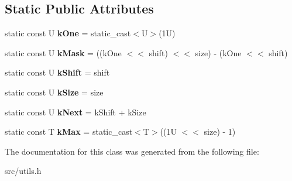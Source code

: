 \subsection*{Static Public Attributes}
\begin{DoxyCompactItemize}
\item 
\hypertarget{classv8_1_1internal_1_1_bit_field_base_af2b0229ffee57c76f39b6a3aad6d22bb}{}static const U {\bfseries k\+One} = static\+\_\+cast$<$U$>$(1\+U)\label{classv8_1_1internal_1_1_bit_field_base_af2b0229ffee57c76f39b6a3aad6d22bb}

\item 
\hypertarget{classv8_1_1internal_1_1_bit_field_base_a26880a1aa7d61fe08bcf77de9ca46b6f}{}static const U {\bfseries k\+Mask} = ((k\+One $<$$<$ shift) $<$$<$ size) -\/ (k\+One $<$$<$ shift)\label{classv8_1_1internal_1_1_bit_field_base_a26880a1aa7d61fe08bcf77de9ca46b6f}

\item 
\hypertarget{classv8_1_1internal_1_1_bit_field_base_a0b0c87744aa976ba62aadb4552e633ef}{}static const U {\bfseries k\+Shift} = shift\label{classv8_1_1internal_1_1_bit_field_base_a0b0c87744aa976ba62aadb4552e633ef}

\item 
\hypertarget{classv8_1_1internal_1_1_bit_field_base_a73ac861af5e2f043ea3ef16bc102571b}{}static const U {\bfseries k\+Size} = size\label{classv8_1_1internal_1_1_bit_field_base_a73ac861af5e2f043ea3ef16bc102571b}

\item 
\hypertarget{classv8_1_1internal_1_1_bit_field_base_ac924450272ea6ed882a43eba783d3488}{}static const U {\bfseries k\+Next} = k\+Shift + k\+Size\label{classv8_1_1internal_1_1_bit_field_base_ac924450272ea6ed882a43eba783d3488}

\item 
\hypertarget{classv8_1_1internal_1_1_bit_field_base_a82aada63ffb94bf07ba4702ec9fc1525}{}static const T {\bfseries k\+Max} = static\+\_\+cast$<$T$>$((1\+U $<$$<$ size) -\/ 1)\label{classv8_1_1internal_1_1_bit_field_base_a82aada63ffb94bf07ba4702ec9fc1525}

\end{DoxyCompactItemize}


The documentation for this class was generated from the following file\+:\begin{DoxyCompactItemize}
\item 
src/utils.\+h\end{DoxyCompactItemize}

